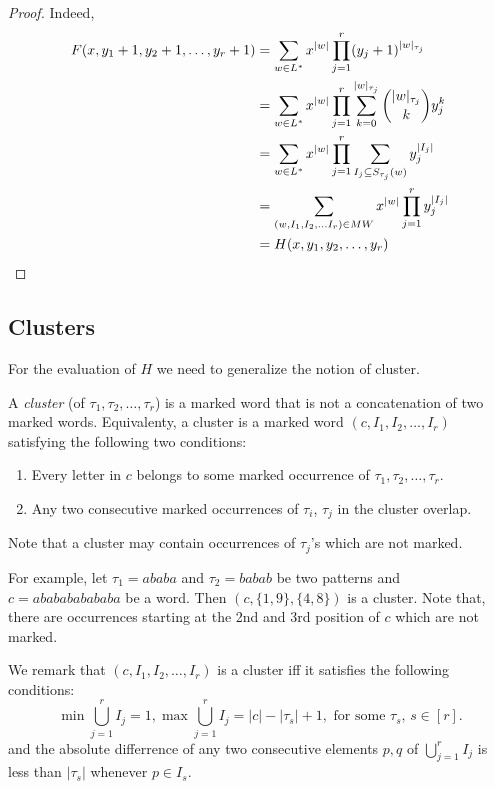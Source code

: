 \documentclass[12pt]{report}
\begin{document}
{{\begin{proof} Indeed,
\begin{align*}
F(x,y_1+1, y_2+1,\ldots, y_r+1) 
& = \sum\limits_{w \in L^*} x^{|w|} \prod\limits_{j=1}^r (y_j + 1)^{|w|_{\tau_j}} \\
& = \sum\limits_{w \in L^*} x^{|w|} \prod\limits_{j=1}^r \sum\limits_{k=0}^{|w|_{\tau_j}} \binom{|w|_{\tau_j}}{k} y_j^k \\
& = \sum\limits_{w \in L^*} x^{|w|} \prod\limits_{j=1}^r \sum\limits_{I_j \subseteq S_{\tau_j}(w)} y_j^{|I_j|}\\
& = \sum\limits_{(w, I_1, I_2, \ldots I_r) \in MW} x^{|w|} \prod\limits_{j=1}^r y_j^{|I_j|} \\
& = H(x,y_1, y_2, \ldots, y_r)  \qedhere
\end{align*}
\end{proof}


\subsection{Clusters}

For the evaluation of $H$ we need to generalize the notion of cluster. 

A {\em cluster} (of $\tau_1, \tau_2, \ldots, \tau_r$) is a marked word that is not a concatenation of two marked words. Equivalenty, a cluster is a marked word $(c, I_1, I_2, \ldots, I_r)$ satisfying the following two conditions:

\begin{enumerate}[label=\roman{*})]

\item Every letter in $c$ belongs to some marked occurrence of $\tau_1, \tau_2, \ldots, \tau_r$.

\item Any two consecutive marked occurrences of $\tau_i$, $\tau_j$ in the cluster overlap.

\end{enumerate}

Note that a cluster may contain occurrences of $\tau_j$'s which are not marked.

For example, let $\tau_1 = ababa$ and $\tau_2=babab$ be two patterns and $c = ababababababa$ be a word. Then $(c,\{1,9\},\{4,8\})$ is a cluster. Note that, there are occurrences starting at the 2nd and 3rd position of $c$ which are not marked.

We remark that $(c, I_1, I_2, \ldots, I_r)$ is a cluster iff it satisfies the following conditions:
\[ \min \bigcup\limits_{j=1}^r I_j = 1, \max \bigcup\limits_{j=1}^r I_j = |c| - |\tau_s| + 1, \textrm{ for some $\tau_s$, $s \in [r]$.}  \]
and the absolute differrence of any two consecutive elements $p, q$ of $\bigcup\limits_{j=1}^r I_j$ is less than $|\tau_s|$ whenever $p \in I_s$.

}}
\end{document}

